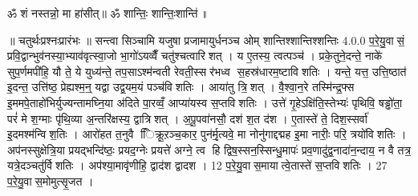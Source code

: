 ॐ शं नस्तन्नो॒ मा हा॑सीत्॥ ॐ शान्तिः॒ शान्तिः॒शान्ति॑॥



\setcounter{anuvakam}{0}
॥ चतुर्थःप्रश्नःप्रारंभः ॥ सन्त्वा सिञ्चामि यजुषा प्रजामायुर्धनञ्च ओम् शान्तिश्शान्तिश्शन्तिः
4.0.0
प॒रे॒यु॒वासं॒ प्रवि॒द्वान्भुव॑नस्या॒भ्याव॑वृत्स्वा॒जो भा॒गो॑ऽयव्वैँ चतु॑श्चत्वारिशत् । य ए॒तस्य॒ त्वत्पञ्च॑ । प्रके॒तुने॒दन्ते॒ नाके॑ सुप॒र्णमपी॑हि॒ यौ ते॒ ये युध्य॑न्ते॒ तप॒साऽश्म॑न्वती रेवती॒स्सर॑भध्व स॒हस्र॑धारम॒ष्टाविशतिः । यन्ते॒ यत्त॒ उत्ति॒ष्ठात॑ इ॒दन्त॒ उत्ति॑ष्ठ॒ प्रेह्यश्म॒न्॒ यद्वा उद्व॒यम॒यं पञ्च॑विशतिः । आया॑तु त्रि॒शत् । वै॒श्वा॒न॒रे तस्मि॑न्द्र॒फ्स इ॒ममपे॒ताहो॑भिर्युज्यन्तामघ्नि॒या अ॑दिते पा॒रव्वँ॒ आप्या॑यस्व स॒प्तविशतिः । उत्ते॑ गृ॒हेऽक्षि॑ति॒स्तेभ्यः॑ पृथिवि॒ षड्ढो॑ता॒ परं॑ मे श॒ग्माः पृ॑थि॒व्या अ॒न्तरि॑क्षस्य॒ द्वात्रिशत् । अ॒पू॒पवा॑नसौ॒ दश॑ श॒त द॑श । ए॒तास्ते॑ ते॒ दिश॒स्सर्वा॑ इ॒दमश्म॑न्विश॒तिः । आरो॑हत त॒नुवै ििक्रू॒ऱञ्च॒कार॒ पुन॑र्मृ॒त्यवे॒ मा नोनु॑गाद्दद्मह इ॒मा नारीः॒ परि॒ त्रयो॑विशतिः । अप॑नस्सुक्षेत्रि॒या प्रयद्भन्दि॑ष्ठः॒ प्रयद॒ग्नेः प्रयत्ते॑ अग्ने॒ त्व हि द्विष॒स्सन॒स्सिन्धु॒मापः॑ प्रव॒णादु॑द्व॒नादा॑न॒न्दाय॒ न वै तत्र॒ यत्रे॒दञ्चतु॑र्विशतिः । अप॑श्या॒मावृ॑णीहि॒ द्वाद॑श द्वादश । 12 प॒रे॒यु॒वास॒मायात्वे॒तास्ते॑ स॒प्तविशतिः । 27 प॒रे॒यु॒वास॒मोमुत्सृ॒जत ।
\anuvakamend


